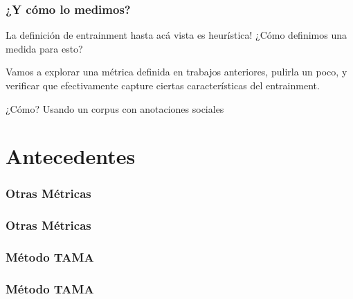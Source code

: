 \documentclass{beamer}
\begin{document}
\begin{frame}
  \frametitle{¿Y cómo lo medimos?}
  La definición de entrainment hasta acá vista es heurística! ¿Cómo definimos una medida para esto?

  Vamos a explorar una métrica definida en trabajos anteriores, pulirla un poco, y verificar que efectivamente capture ciertas características del entrainment.

  ¿Cómo? Usando un corpus con anotaciones sociales


\end{frame}


\section{Antecedentes}

\begin{frame}
  \frametitle{Otras Métricas}
\end{frame}

\begin{frame}
  \frametitle{Otras Métricas}
  \subtitle{Problemas}
\end{frame}



\begin{frame}
  \frametitle{Método TAMA}
\end{frame}


\begin{frame}
  \frametitle{Método TAMA}
  \subtitle{Ventajas}
\end{frame}
\end{document}
